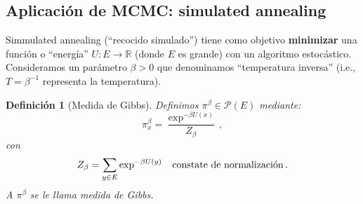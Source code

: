 \documentclass[letterpaper,11pt]{article} %
\def\espacio{\hspace{.25cm}\,}
\theoremstyle{defbreak}
\newtheorem{definition}{Definición}[subsection]
\theoremstyle{propbreak}
\theoremstyle{remark}
\theoremstyle{break}
\def\R{\mathbb{R}}
\begin{document}
\subsection{Aplicación de MCMC: simulated annealing}
Simmulated annealing (``recocido simulado'') tiene como objetivo \textbf{minimizar} una funci\'on o  ``energía'' $U:E\to\R$ (donde $E$ es grande) con un algoritmo estocástico.
\newp Consideramos un par\'ametro  $\beta>0$ que denominamos ``temperatura inversa'' (i.e., $T=\beta^{-1}$ representa la temperatura).
\vspace{.2cm} \\ %
\begin{definition}[Medida de Gibbs]
Definimos $\pi^\beta\in\mathcal{P}(E)$ mediante:
$$ \pi^\beta_x = \displaystyle \frac{\exp^{-\beta U(x)}}{Z_\beta}\,,$$
con
$$ Z_\beta = \displaystyle\sum_{y\in E}\exp^{-\beta U(y)} \espacio\mbox{constate de normalización}\,.$$
A $\pi^\beta$ se le llama medida de Gibbs.
\vspace{.5cm} \\ %
\end{definition}
\end{document}
